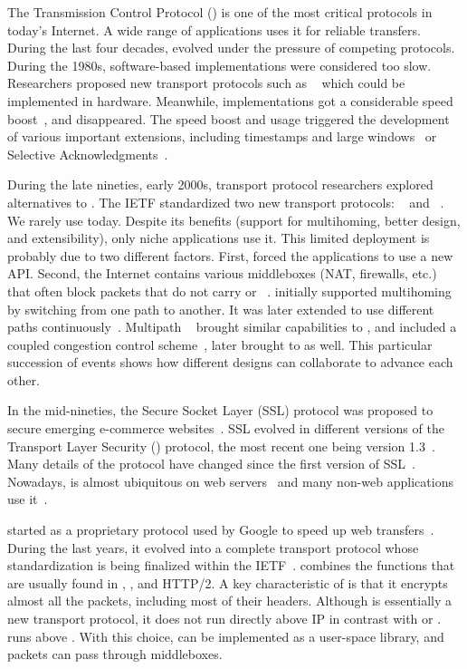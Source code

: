 The Transmission Control Protocol (\tcp) \cite{rfc793} is one of the most
critical protocols in today's Internet. A wide range of applications uses it for
reliable transfers. During the last four decades, \tcp evolved under the
pressure of competing protocols. During the 1980s, software-based \tcp
implementations were considered too slow. Researchers proposed new transport
protocols such as \xtp~\cite{sanders1990xpress} which could be implemented in
hardware. Meanwhile, \tcp implementations got a considerable speed
boost~\cite{clark1989analysis}, and \xtp disappeared. The \tcp speed boost and
usage triggered the development of various important \tcp extensions, including
timestamps and large windows~\cite{rfc1323} or Selective
Acknowledgments~\cite{rfc2018}.

During the late nineties, early 2000s, transport protocol researchers explored
alternatives to \tcp. The IETF standardized two new transport protocols:
\dccp~\cite{kohler2006designing} and \sctp~\cite{rfc4960}. We rarely use \dccp
today. Despite its benefits (support for multihoming, better design, and
extensibility), only niche applications use it. This limited deployment is
probably due to two different factors. First, \sctp forced the applications to
use a new API. Second, the Internet contains various middleboxes (NAT,
firewalls, etc.) that often block packets that do not carry \tcp or
\udp~\cite{honda2011still}.  \sctp initially supported multihoming by switching
from one path to another. It was later extended to use different
paths continuously~\cite{iyengar2006concurrent}.  Multipath
\tcp~\cite{rfc6824,raiciu2012hard} brought similar capabilities to \tcp, and
included a coupled congestion control scheme~\cite{wischik2011design}, later
brought to \sctp as well. This particular succession of events shows how
different designs can collaborate to advance each other.

In the mid-nineties, the Secure Socket Layer (SSL) protocol was proposed to
secure emerging e-commerce websites~\cite{draft-hickman-netscape-ssl}. SSL
evolved in different versions of the Transport Layer Security (\tls) protocol,
the most recent one being version 1.3~\cite{rfc8446}. Many details of the \tls
protocol have changed since the first version of SSL~\cite{kotzias2018coming}.
Nowadays, \tls is almost ubiquitous on web servers~\cite{holz2019era} and many non-web applications use it~\cite{anderson2019tls}.

\quic started as a proprietary protocol used by Google to speed up web
transfers~\cite{roskind2013quic,langley2017quic}. During the last years, it
evolved into a complete transport protocol whose standardization is being
finalized within the IETF~\cite{draft-ietf-quic-transport}. \quic combines the
functions that are usually found in \tcp, \tls, and HTTP/2. A key characteristic
of \quic is that it encrypts almost all the packets, including most of their
headers. Although \quic is essentially a new transport protocol, it does not run
directly above IP in contrast with \sctp or \tcp. \quic runs above \udp. With
this choice, \quic can be implemented as a user-space library, and \quic packets
can pass through middleboxes.

